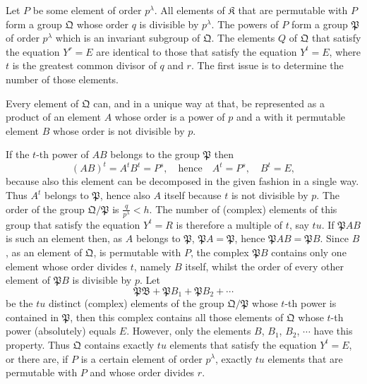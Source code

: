 \documentclass[a5paper,12pt]{article}
\let\fr\mathfrak
\newcommand{\CB}{\fr{B}}
\newcommand{\CK}{\fr{K}}
\newcommand{\CP}{\fr{P}}
\newcommand{\CQ}{\fr{Q}}
\newcommand{\?}{{\color{blue}${}^{(?)}$}}
\begin{document}

Let $P$ be some element of order $p^\lambda$.
%
%
All elements of $\CK$ that are permutable with $P$
form a group $\CQ$
whose order $q$ is divisible by $p^\lambda$.
%
%
The powers of $P$ 
form a group $\CP$ of order $p^\lambda$
which is an invariant subgroup of $\CQ$.
%
%
The elements $Q$ of $\CQ$
that satisfy the equation $Y^r = E$
are identical
to those
that satisfy the equation $Y^t = E$,
where $t$ 
is 
the greatest common divisor of $q$ and $r$.
%
%
The first issue
is to determine
the number of those elements.


Every element of $\CQ$ can,
and in a unique way at that,
be represented 
as a product 
of an element $A$
whose order is a power of $p$
and
a with it permutable element $B$
whose order is not divisible by $p$.


If the $t$-th power of $A B$
belongs to the group $\CP$
then
\[
	(A B)^t = A^t B^t = P^s,
	\quad
	\text{hence}
	\quad
	A^t = P^s,
	\quad
	B^t = E,
\]
because also this element
can be decomposed in the given fashion
in a single way.
%
%
Thus
$A^t$ belongs to $\CP$,
hence also $A$ itself
because $t$ is not divisible by $p$.
%
%
The order of the group $\CQ / \CP$ 
is 
$\frac{q}{p^\lambda} < h$.
%
%
The number of (complex) elements
of this group
that satisfy the equation $Y^t = R$
is therefore 
a multiple of $t$,
say $t u$.
%
%
If $\CP A B$ is such an element
then,
as $A$ belongs to $\CP$,
$\CP A = \CP$,
hence $\CP A B = \CP B$.
%
%
Since $B$,
as an element of $\CQ$,
is permutable with $P$,
the complex $\CP B$
contains only one element
whose order divides $t$,
namely $B$ itself,
whilst
the order of every other element of $\CP B$
is divisible by $p$.
%
%
Let
\[
	\CP \CB + \CP B_1 + \CP B_2 + \cdots
\]
be the $t u$ distinct (complex) elements
of the group $\CQ / \CP$
whose
$t$-th power is contained in $\CP$,
then
this complex contains all those elements of $\CQ$
whose $t$-th power 
(absolutely)
equals $E$.
%
%
However,
only the elements $B$, $B_1$, $B_2$, $\cdots$
have this property.
%
%
Thus $\CQ$ contains
exactly $t u$ elements
that satisfy the equation $Y^t = E$,
or
there are,
if $P$ is a certain element of order $p^\lambda$,
exactly $t u$ elements
that are permutable with $P$
and
whose order divides $r$.

\end{document}
